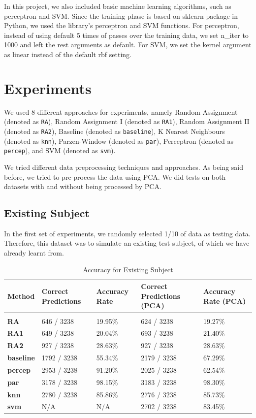 \documentclass{article} %
\begin{document}
In this project, we also included basic machine learning algorithms, such as perceptron and SVM. Since the training phase is based on sklearn package in Python, we used the library’s perceptron and SVM functions. For perceptron, instead of using default 5 times of passes over the training data, we set n\_iter to 1000 and left the rest arguments as default. For SVM, we set the kernel argument as linear instead of the default rbf setting.

\section{Experiments}

We used 8 different approaches for experiments, namely Random Assignment (denoted as \texttt{RA}), Random Assignment I (denoted as \texttt{RA1}), Random Assignment II (denoted as \texttt{RA2}), Baseline (denoted as \texttt{baseline}), K Nearest Neighbours (denoted as \texttt{knn}), Parzen-Window (denoted as \texttt{par}), Perceptron (denoted as \texttt{percep}), and SVM (denoted as \texttt{svm}).

We tried different data preprocessing techniques and approaches. As being said before, we tried to pre-process the data using PCA. We did tests on both datasets with and without being processed by PCA.

\subsection{Existing Subject}

In the first set of experiments, we randomly selected 1/10 of data as testing data. Therefore, this dataset was to simulate an existing test subject, of which we have already learnt from.

\begin{table}[H]
\caption{Accuracy for Existing Subject}
\begin{center}
\begin{tabular}{l||ll|ll}
{\bf Method} & {\bf Correct Predictions} & {\bf Accuracy Rate} & {\bf Correct Predictions (PCA)} & {\bf Accuracy Rate (PCA)} \\
\hline &&&& \\
{\bf RA}       &  646 / 3238 & 19.95\% &  624 / 3238 & 19.27\% \\
{\bf RA1}      &  649 / 3238 & 20.04\% &  693 / 3238 & 21.40\% \\
{\bf RA2}      &  927 / 3238 & 28.63\% &  927 / 3238 & 28.63\% \\
{\bf baseline} & 1792 / 3238 & 55.34\% & 2179 / 3238 & 67.29\% \\
{\bf percep}   & 2953 / 3238 & 91.20\% & 2025 / 3238 & 62.54\% \\
{\bf par}      & 3178 / 3238 & 98.15\% & 3183 / 3238 & 98.30\% \\
{\bf knn}      & 2780 / 3238 & 85.86\% & 2776 / 3238 & 85.73\% \\
{\bf svm}      &     N/A     &     N/A & 2702 / 3238 & 83.45\% \\
\end{tabular}
\end{center}
\end{table}
\end{document}
